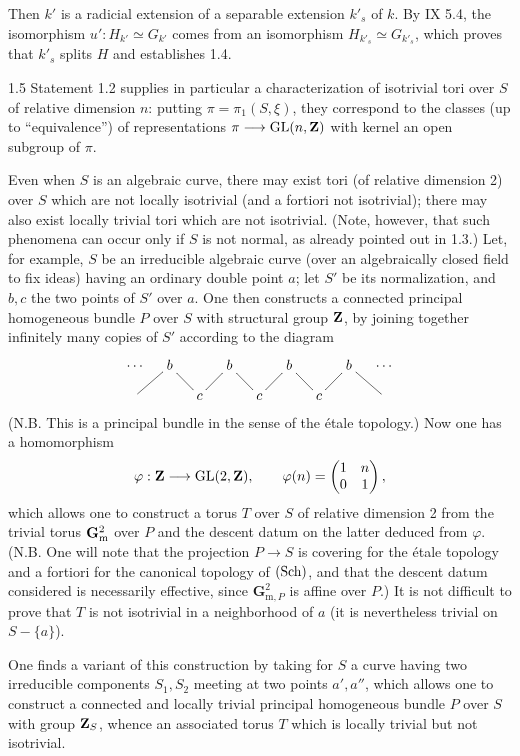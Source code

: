 Then $k'$ is a radicial extension of a separable extension $k'_s$ of $k$. By IX 5.4, the isomorphism $u':H_{k'}\simeq G_{k'}$ comes from an isomorphism $H_{k'_s}\simeq G_{k'_s}$, which proves that $k'_s$ splits $H$ and establishes 1.4.
\begin{remark}{1.5}\label{X.1.5}
Statement 1.2 supplies in particular a characterization of isotrivial tori over $S$ of relative dimension $n$: putting $\pi=\pi_1(S,\xi)$, they correspond to the classes (up to ``equivalence'') of representations $\pi\longrightarrow\operatorname{GL}(n,\mathbf{Z})$ with kernel an open subgroup of $\pi$.
\end{remark}
Even when $S$ is an algebraic curve, there may exist tori (of relative dimension 2) over $S$ which are not locally isotrivial (and a fortiori not isotrivial); there may also exist locally trivial tori which are not isotrivial. (Note, however, that such phenomena can occur only if $S$ is not normal, as already pointed out in 1.3.) Let, for example, $S$ be an irreducible algebraic curve (over an algebraically closed field to fix ideas) having an ordinary double point $a$; let $S'$ be its normalization, and $b,c$ the two points of $S'$ over $a$. One then constructs a connected principal homogeneous bundle $P$ over $S$ with structural group $\mathbf{Z}$, by joining together infinitely many copies of $S'$ according to the diagram
\[
\xymatrix@C=11pt@R=10pt{\cdots&b\ar@{-}[dl]\ar@{-}[dr]&&b\ar@{-}[dl]\ar@{-}[dr]&&b\ar@{-}[dl]\ar@{-}[dr]&&b\ar@{-}[dl]\ar@{-}[dr]&\cdots\\{}&&c&&c&&c&&{}}
\]
(N.B. This is a principal bundle in the sense of the étale topology.) Now one has a homomorphism
\[
\varphi:\mathbf{Z}\longrightarrow\operatorname{GL}(2,\mathbf{Z}),\qquad\varphi(n)=\begin{pmatrix}1&n\\0&1\end{pmatrix},
\]
which allows one to construct a torus $T$ over $S$ of relative dimension 2 from the trivial torus $\mathbf{G}_{\mathrm{m}}^2$ over $P$ and the descent datum on the latter deduced from $\varphi$. (N.B. One will note that the projection $P\to S$ is covering for the étale topology and a fortiori for the canonical topology of $\textup{(Sch)}$, and that the descent datum considered is necessarily effective, since $\mathbf{G}_{\mathrm{m},P}^2$ is affine over $P$.) It is not difficult to prove that $T$ is not isotrivial in a neighborhood of $a$ (it is nevertheless trivial on $S-\{a\}$).

One finds a variant of this construction by taking for $S$ a curve having two irreducible components $S_1,S_2$ meeting at two points $a',a''$, which allows one to construct a connected and locally trivial principal homogeneous bundle $P$ over $S$ with group $\mathbf{Z}_S$, whence an associated torus $T$ which is locally trivial but not isotrivial.

